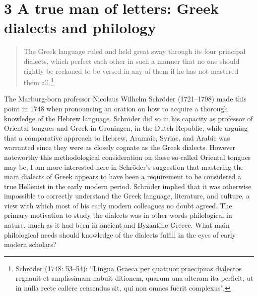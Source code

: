\section{\textsc{3} A true man of letters: Greek dialects and philology}
\hypertarget{Toc19704818}{}\begin{quote}
The Greek language ruled and held great sway through its four principal dialects, which perfect each other in such a manner that no one should rightly be reckoned to be versed in any of them if he has not mastered them all.\footnote{Schröder (1748: 53–54): “Lingua Graeca per quattuor praecipuas dialectos regnauit et amplissimam habuit ditionem, quarum una alteram ita perficit, ut in nulla recte callere censendus sit, qui non omnes fuerit complexus”.}
\end{quote}

The Marburg-born professor Nicolaus Wilhelm Schröder (1721–1798) made this point in 1748 when pronouncing an oration on how to acquire a thorough knowledge of the Hebrew language. Schröder did so in his capacity as professor of Oriental tongues and Greek in Groningen, in the Dutch Republic, while arguing that a comparative approach to Hebrew, Aramaic, Syriac, and Arabic was warranted since they were as closely cognate as the Greek dialects. However noteworthy this methodological consideration on these so-called Oriental tongues may be, I am more interested here in Schröder’s suggestion that mastering the main dialects of Greek appears to have been a requirement to be considered a true Hellenist in the early modern period. Schröder implied that it was otherwise impossible to correctly understand the Greek language, literature, and culture, a view with which most of his early modern colleagues no doubt agreed. The primary motivation to study the dialects was in other words philological in nature, much as it had been in ancient and Byzantine Greece. What main philological needs should knowledge of the dialects fulfill in the eyes of early modern scholars?

